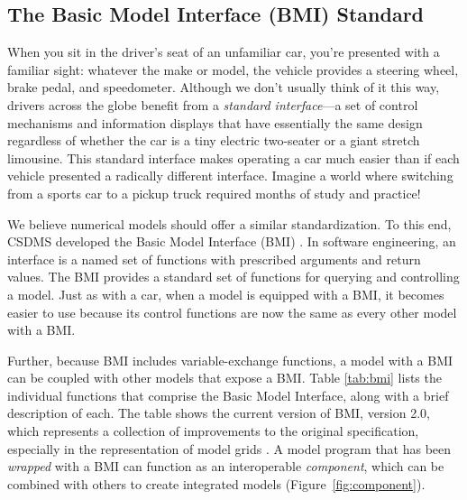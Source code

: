 \documentclass{article} %
\begin{document}
\subsection{The Basic Model Interface (BMI) Standard}
\label{sec:bmi}




When you sit in the driver's seat of an unfamiliar car,
you're presented with a familiar sight:
whatever the make or model,
the vehicle provides
a steering wheel, brake pedal, and speedometer.
Although we don't usually think of it this way,
drivers across the globe benefit
from a \textit{standard interface}---a set of control mechanisms and information displays
that have %
essentially the same design
regardless of whether the car
is a tiny electric two-seater or a giant stretch limousine.
This standard interface makes operating a car much easier
than if each vehicle presented a radically different interface.
Imagine a world where switching from a sports car to a pickup truck
required months of study and practice!

We believe %
numerical models should offer a similar standardization.
To this end, CSDMS
developed the Basic Model Interface (BMI) \citep{peckham2013component,hutton2020basic}.
In software engineering,
an interface is a named set of functions
with prescribed arguments and return values.
The BMI provides a standard set of functions
for querying and controlling a model.
Just as with a car,
when a model is equipped with a BMI,
it becomes easier to use
because its control functions are now the same as every other model with a BMI.

Further, because BMI includes variable-exchange functions,
a model with a BMI can be coupled with other models that expose a BMI.
Table \ref{tab:bmi} lists the individual functions
that comprise the Basic Model Interface,
along with a brief description of each.
The table shows the current version of BMI, version 2.0,
which represents a collection of improvements to the original specification,
especially in the representation of model grids \citep{hutton2020basic}. A model program that has been \textit{wrapped} with a BMI can function as an interoperable \textit{component}, which can be combined with others to create integrated models (Figure~\ref{fig:component}).
\end{document}
